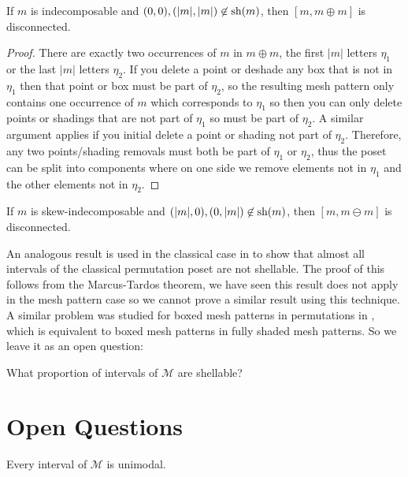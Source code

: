 \documentclass[11pt,a4paper,oneside]{article}
\begin{document}
\begin{lem}
If $m$ is indecomposable and $(0,0),(|m|,|m|)\not\in\operatorname{\textrm{sh}}(m)$, then
$[m,m\oplus m]$ is disconnected.
\begin{proof}
There are exactly two occurrences of $m$ in $m\oplus m$, the first $|m|$ letters
$\eta_1$ or the last $|m|$ letters $\eta_2$. If you delete a point or deshade
any box that is not in $\eta_1$ then that point or box must be part of $\eta_2$,
so the resulting mesh pattern only contains one occurrence of $m$ which
corresponds to $\eta_1$ so then you can only delete points or shadings that are
not part of $\eta_1$ so must be part of $\eta_2$. A similar argument applies if
you initial delete a point or shading not part of $\eta_2$. Therefore, any two
points/shading removals must both be part of $\eta_1$ or $\eta_2$, thus the
poset can be split into components where on one side we remove elements not in
$\eta_1$ and the other elements not in $\eta_2$.
\end{proof}
\end{lem}
\begin{cor}
If $m$ is skew-indecomposable and $(|m|,0),(0,|m|)\not\in\operatorname{\textrm{sh}}(m)$, then
$[m,m\ominus m]$ is disconnected.
\end{cor}

An analogous result is used in the classical case in \cite{McSt13} to show that
almost all intervals of the classical permutation poset are not shellable. The
proof of this follows from the Marcus-Tardos theorem, we have seen this result
does not apply in the mesh pattern case so we cannot prove a similar result
using this technique.  A similar problem was studied for boxed mesh patterns in
permutations in \cite{AKV13}, which is equivalent to boxed mesh patterns in
fully shaded mesh patterns. So we leave it as an open question:

\begin{que}
What proportion of intervals of $\mathcal{M}$ are shellable?
\end{que}

\section{Open Questions}

\begin{conj}
Every interval of $\mathcal{M}$ is unimodal.
\end{conj}



\end{document}

